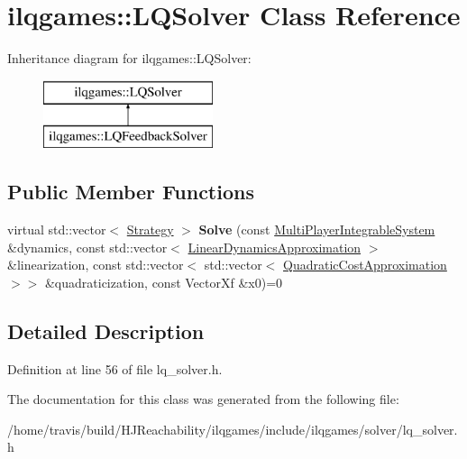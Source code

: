 \hypertarget{classilqgames_1_1_l_q_solver}{}\section{ilqgames\+:\+:L\+Q\+Solver Class Reference}
\label{classilqgames_1_1_l_q_solver}
Inheritance diagram for ilqgames\+:\+:L\+Q\+Solver\+:\begin{figure}[H]
\begin{center}
\leavevmode
\includegraphics[height=1.996435cm]{classilqgames_1_1_l_q_solver}
\end{center}
\end{figure}
\subsection*{Public Member Functions}
\begin{DoxyCompactItemize}
\item 
virtual std\+::vector$<$ \hyperlink{structilqgames_1_1_strategy}{Strategy} $>$ {\bfseries Solve} (const \hyperlink{classilqgames_1_1_multi_player_integrable_system}{Multi\+Player\+Integrable\+System} \&dynamics, const std\+::vector$<$ \hyperlink{structilqgames_1_1_linear_dynamics_approximation}{Linear\+Dynamics\+Approximation} $>$ \&linearization, const std\+::vector$<$ std\+::vector$<$ \hyperlink{structilqgames_1_1_quadratic_cost_approximation}{Quadratic\+Cost\+Approximation} $>$$>$ \&quadraticization, const Vector\+Xf \&x0)=0\hypertarget{classilqgames_1_1_l_q_solver_af834df3ef93119e3d0af7823b36a83ac}{}\label{classilqgames_1_1_l_q_solver_af834df3ef93119e3d0af7823b36a83ac}

\end{DoxyCompactItemize}


\subsection{Detailed Description}


Definition at line 56 of file lq\+\_\+solver.\+h.



The documentation for this class was generated from the following file\+:\begin{DoxyCompactItemize}
\item 
/home/travis/build/\+H\+J\+Reachability/ilqgames/include/ilqgames/solver/lq\+\_\+solver.\+h\end{DoxyCompactItemize}
